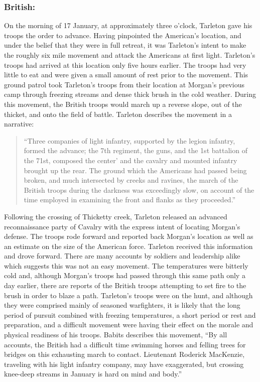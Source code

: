 \subsubsection{British:}

On the morning of 17 January, at approximately three o'clock, Tarleton gave his
troops the order to advance. Having pinpointed the American's location, and
under the belief that they were in full retreat, it was Tarleton's intent to
make the roughly six mile movement and attack the Americans at first light.
Tarleton's troops had arrived at this location only five hours earlier. The
troops had very little to eat and were given a small amount of rest prior to
the movement. This ground patrol took Tarleton's troops from their location at
Morgan's previous camp through freezing streams and dense thick brush in the
cold weather. During this movement, the British troops would march up a reverse
slope, out of the thicket, and onto the field of battle. Tarleton describes the
movement in a narrative:

\begin{quote}
 ``Three companies of light infantry, supported by the legion infantry, formed
 the advance; the 7th regiment, the guns, and the 1st battalion of the 71st,
 composed the center' and the cavalry and mounted infantry brought up the rear.
 The ground which the Americans had passed being broken, and much intersected
 by creeks and ravines, the march of the British troops during the darkness was
 exceedingly slow, on account of the time employed in examining the front and
 flanks as they proceeded.'' \cite[TAB Q, 14]{rauch_battle_2007}
\end{quote}

Following the crossing of Thicketty creek, Tarleton released an advanced
reconnaissance party of Cavalry with the express intent of locating Morgan's
defense. The troops rode forward and reported back Morgan's location as well as
an estimate on the size of the American force. Tarleton received this
information and drove forward. There are many accounts by soldiers and
leadership alike which suggests this was not an easy movement. The temperatures
were bitterly cold and, although Morgan's troops had passed through this same
path only a day earlier, there are reports of the British troops attempting to
set fire to the brush in order to blaze a path. Tarleton's troops were on the
hunt, and although they were comprised mainly of seasoned warfighters, it is
likely that the long period of pursuit combined with freezing temperatures, a
short period or rest and preparation, and a difficult movement were having
their effect on the morale and physical readiness of his troops. Babits
describes this movement, ``By all accounts, the British had a difficult time
swimming horses and felling trees for bridges on this exhausting march to
contact. Lieutenant Roderick MacKenzie, traveling with his light infantry
company, may have exaggerated, but crossing knee-deep streams in January is
hard on mind and body.'' \cite[57]{babits_devil_2001}

